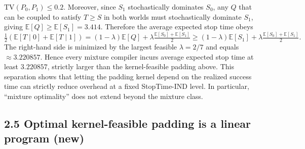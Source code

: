 \documentclass[11pt]{article}
\begin{document}
\(\mathrm{TV}(P_0,P_1)\le 0.2\). Moreover, since \(S_1\) stochastically
dominates \(S_0\), any \(Q\) that can be coupled to satisfy \(T\ge S\)
in both worlds must stochastically dominate \(S_1\), giving
\(\mathbb{E}[Q]\ge \mathbb{E}[S_1]=3.414\). Therefore the average
expected stop time obeys \[
\tfrac12(\mathbb{E}[T\mid 0]+\mathbb{E}[T\mid 1])
=(1-\lambda)\mathbb{E}[Q]+\lambda\tfrac{\mathbb{E}[S_0]+\mathbb{E}[S_1]}{2}
\ge (1-\lambda)\mathbb{E}[S_1]+\lambda\tfrac{\mathbb{E}[S_0]+\mathbb{E}[S_1]}{2}.
\] The right-hand side is minimized by the largest feasible
\(\lambda=2/7\) and equals \(\approx 3.220857\). Hence every mixture
compiler incurs average expected stop time at least \(3.220857\),
strictly larger than the kernel-feasible padding above. This separation
shows that letting the padding kernel depend on the realized success
time can strictly reduce overhead at a fixed StopTime-IND level. In
particular, ``mixture optimality'' does not extend beyond the mixture
class.

\hypertarget{optimal-kernel-feasible-padding-is-a-linear-program-new}{%
\subsection{2.5 Optimal kernel-feasible padding is a linear program
(new)}\label{optimal-kernel-feasible-padding-is-a-linear-program-new}}
\end{document}
